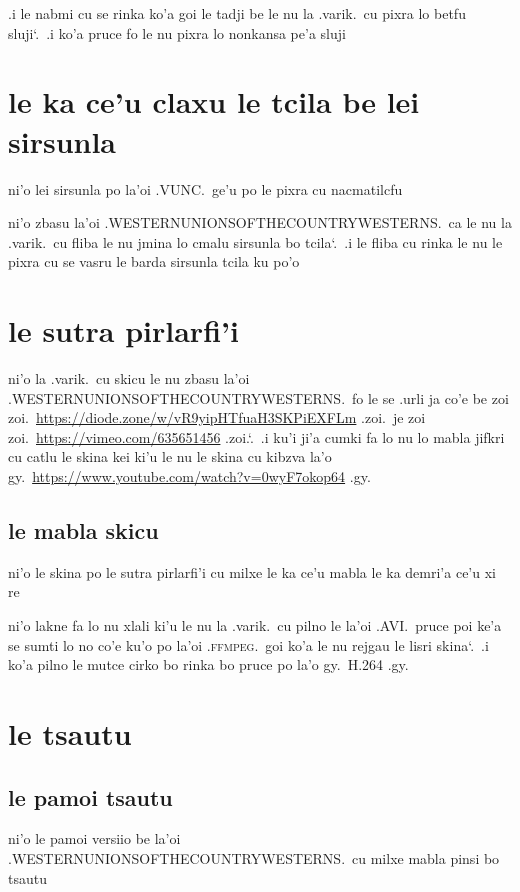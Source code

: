 \documentclass{report}
\newcommand\sds{\spacefactor\sfcode`.\ \space}
\begin{document}
.i le nabmi cu se rinka ko'a goi le tadji be le nu la .varik.\ cu pixra lo betfu sluji\sds  .i ko'a pruce fo le nu pixra lo nonkansa pe'a sluji

\section{le ka ce'u claxu le tcila be lei sirsunla}
ni'o lei sirsunla po la'oi .VUNC.\ ge'u po le pixra cu nacmatilcfu

ni'o zbasu la'oi .WESTERNUNIONSOFTHECOUNTRYWESTERNS.\ ca le nu la .varik.\ cu fliba le nu jmina lo cmalu sirsunla bo tcila\sds  .i le fliba cu rinka le nu le pixra cu se vasru le barda sirsunla tcila ku po'o

\section{le sutra pirlarfi'i}
ni'o la .varik.\ cu skicu le nu zbasu la'oi .WESTERNUNIONSOFTHECOUNTRYWESTERNS.\ fo le se .urli ja co'e be zoi zoi.\ \url{https://diode.zone/w/vR9yipHTfuaH3SKPiEXFLm} .zoi.\ je zoi zoi.\ \url{https://vimeo.com/635651456} .zoi.\sds  .i ku'i ji'a cumki fa lo nu lo mabla jifkri cu catlu le skina kei ki'u le nu le skina cu kibzva la'o gy.\ \url{https://www.youtube.com/watch?v=0wyF7okop64} .gy.

\subsection{le mabla skicu}
ni'o le skina po le sutra pirlarfi'i cu milxe le ka ce'u mabla le ka demri'a ce'u xi re

ni'o lakne fa lo nu xlali ki'u le nu la .varik.\ cu pilno le la'oi .AVI.\ pruce poi ke'a se sumti lo no co'e ku'o po la'oi .\textsc{ffmpeg}.\ goi ko'a le nu rejgau le lisri skina\sds  .i ko'a pilno le mutce cirko bo rinka bo pruce po la'o gy.\ H.264 .gy.

\section{le tsautu}
\subsection{le pamoi tsautu}
ni'o le pamoi versiio be la'oi .WESTERNUNIONSOFTHECOUNTRYWESTERNS.\ cu milxe mabla pinsi bo tsautu
\end{document}
